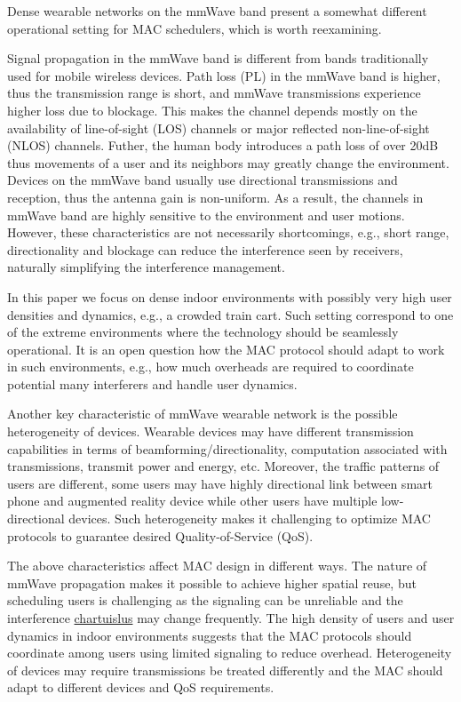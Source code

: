 \documentclass[10pt, conference, letterpaper]{IEEEtran}
\begin{document}
Dense wearable networks on the mmWave band present a somewhat different operational setting for MAC schedulers, which is worth reexamining.


Signal propagation in the mmWave band is different from bands traditionally used for mobile wireless devices. 
Path loss (PL) in the mmWave band is higher, thus the transmission range is short, and mmWave transmissions experience higher loss due to blockage. 
This makes the channel depends mostly on the availability of line-of-sight (LOS) channels or major reflected non-line-of-sight (NLOS) channels.
Futher, the human body introduces a path loss of over 20dB \cite{humanshadowing} thus movements of a user and its neighbors may greatly change the environment.
Devices on the mmWave band usually use directional transmissions and reception, thus the antenna gain is non-uniform. 
As a result, the channels in mmWave band are highly sensitive to the environment and user motions. 
However, these characteristics are not necessarily shortcomings, e.g., short range, directionality and blockage can reduce the interference seen by receivers, naturally simplifying the interference management. 


In this paper we focus on dense indoor environments with possibly very high user densities and dynamics, e.g., a crowded train cart.
Such setting correspond to one of the extreme environments where the technology should be seamlessly operational. 
It is an open question how the MAC protocol should adapt to work in such environments, e.g., how much overheads are required to coordinate potential many interferers and handle user dynamics.


Another key characteristic of mmWave wearable network is the possible heterogeneity of devices. 
Wearable devices may have different transmission capabilities in terms of beamforming/directionality, computation associated with transmissions, transmit power and energy, etc. 
Moreover, the traffic patterns of users are different, some users may have highly directional link between smart phone and augmented reality device while other users have multiple low-directional devices.
Such heterogeneity makes it challenging to optimize MAC protocols to guarantee desired Quality-of-Service (QoS).


The above characteristics affect MAC design in different ways. 
The nature of mmWave propagation makes it possible to achieve higher spatial reuse, but scheduling users is challenging as the signaling can be unreliable and the interference \underline{chartuislus} may change frequently.
The high density of users and user dynamics in indoor environments suggests that the MAC protocols should coordinate among users using limited signaling to reduce overhead. 
Heterogeneity of devices may require transmissions be treated differently and the MAC should adapt to different devices and QoS requirements.
\end{document}
